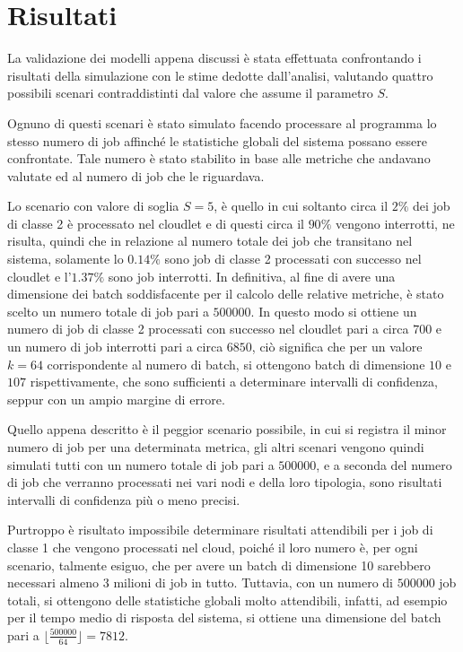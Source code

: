 \section{Risultati}
La validazione dei modelli appena discussi è stata effettuata confrontando i
risultati della simulazione con le stime dedotte dall'analisi, valutando quattro
possibili scenari contraddistinti dal valore che assume il parametro $S$.

Ognuno di questi scenari è stato simulato facendo processare al programma lo
stesso numero di job affinché le statistiche globali del sistema possano
essere confrontate. Tale numero è stato stabilito in base alle metriche che
andavano valutate ed al numero di job che le riguardava.

Lo scenario con valore di soglia $S=5$, è quello in cui soltanto circa il $2\%$
dei job di classe 2 è processato nel cloudlet e di questi circa il $90\%$
vengono interrotti, ne risulta, quindi che in relazione al numero totale dei job
che transitano nel sistema, solamente lo $0.14\%$ sono job di classe 2
processati con successo nel cloudlet e l'$1.37\%$ sono job interrotti. In
definitiva, al fine di avere una dimensione dei batch soddisfacente per il
calcolo delle relative metriche, è stato scelto un numero totale di job pari a
$500000$. In questo modo si ottiene un numero di job di classe 2 processati con
successo nel cloudlet pari a circa $700$ e un numero di job interrotti pari a
circa $6850$, ciò significa che per un valore $k=64$ corrispondente al numero
di batch, si ottengono batch di dimensione $10$ e $107$ rispettivamente, che
sono sufficienti a determinare intervalli di confidenza, seppur con un ampio
margine di errore.

Quello appena descritto è il peggior scenario possibile, in cui si registra il
minor numero di job per una determinata metrica, gli altri scenari vengono
quindi simulati tutti con un numero totale di job pari a $500000$, e a seconda
del numero di job che verranno processati nei vari nodi e della loro tipologia,
sono risultati intervalli di confidenza più o meno precisi.

Purtroppo è risultato impossibile determinare risultati attendibili per i job
di classe 1 che vengono processati nel cloud, poiché il loro numero è, per ogni
scenario, talmente esiguo, che per avere un batch di dimensione 10 sarebbero
necessari almeno 3 milioni di job in tutto. Tuttavia, con un numero di
$500000$ job totali, si ottengono delle statistiche globali molto attendibili,
infatti, ad esempio per il tempo medio di risposta del sistema, si ottiene 
una dimensione del batch pari a $\lfloor\frac{500000}{64}\rfloor = 7812$.

